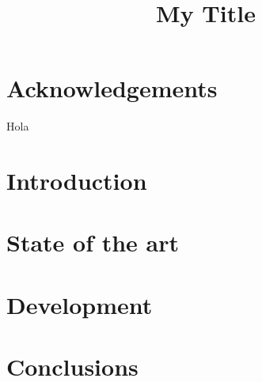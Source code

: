\documentclass{article}
\title{My Title}
\begin{document}
\tableofcontents

\section*{Acknowledgements}

Hola

\section{Introduction}

\section{State of the art}

\section{Development}

\section{Conclusions}
\end{document}
